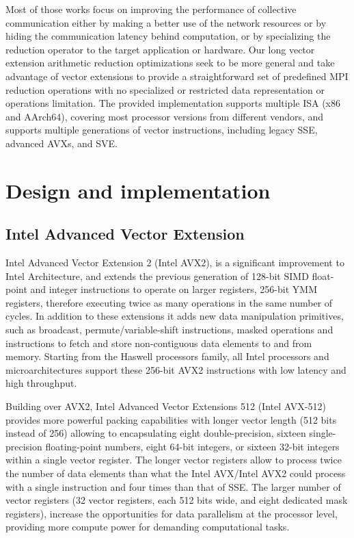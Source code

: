 \documentclass[5p,times,twocolumn]{elsarticle}
\begin{document}
Most of those works focus on improving the performance of collective
communication either by making a better use of the network resources or by hiding the communication latency behind computation, or by specializing the reduction operator to the target application or hardware.
Our long vector extension arithmetic reduction
optimizations seek to be more general and take advantage of vector extensions to provide a
straightforward set of predefined MPI reduction operations with no specialized or restricted data representation or operations limitation.
The provided implementation supports multiple ISA (x86 and AArch64), covering most processor versions from different vendors, and supports multiple generations of vector instructions, including legacy SSE, advanced AVXs, and SVE.

\section{Design and implementation}\label{sec:design}
\subsection{Intel Advanced Vector Extension}
Intel Advanced Vector Extension 2 (Intel AVX2), is a significant improvement to Intel Architecture, and extends the previous generation of 128-bit SIMD float-point
and integer instructions to operate on larger registers, 256-bit YMM registers, therefore executing twice as many operations in the same number of cycles.
%
In addition to these extensions it adds new data manipulation primitives, such as broadcast, permute/variable-shift instructions, masked operations and instructions to fetch and store non-contiguous data elements to and from memory. Starting from the Haswell processors family, all Intel processors and microarchitectures support these 256-bit AVX2 instructions with low latency and high throughput.

Building over AVX2, Intel Advanced Vector Extensions 512 (Intel AVX-512) provides more powerful packing
capabilities with longer vector length (512 bits instead of 256) allowing to encapsulating eight double-precision,
sixteen single-precision floating-point numbers,
eight 64-bit integers, or sixteen 32-bit integers within a single vector register.
The longer vector registers allow to process twice the number of data elements
than what the Intel AVX/Intel AVX2 could
process with a single instruction and four times than that of SSE.
The larger number of vector registers (32 vector registers, each 512 bits wide,
and eight dedicated mask registers), increase the opportunities for data parallelism at the processor level, providing more compute power for demanding computational tasks.
\end{document}
